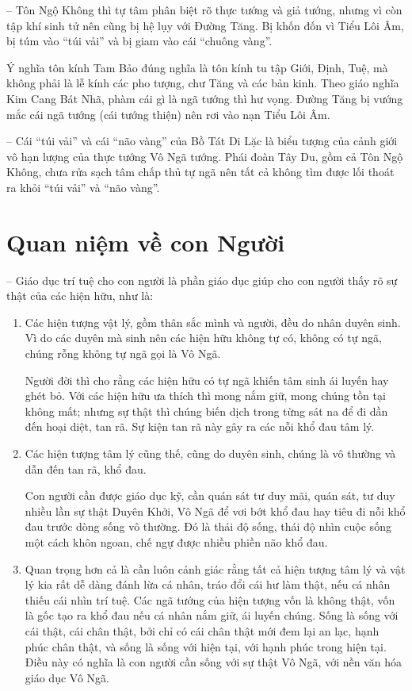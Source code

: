-- Tôn Ngộ Không thì tự tâm phân biệt rõ thực tướng và giả tướng, nhưng vì còn tập khí sinh tử nên cũng bị hệ lụy với Đường Tăng. Bị khốn đốn vì Tiểu Lôi Âm, bị túm vào ``túi vải'' và bị giam vào cái ``chuông vàng''.

Ý nghĩa tôn kính Tam Bảo đúng nghĩa là tôn kính tu tập Giới, Định, Tuệ, mà không phải là lễ kính các pho tượng, chư Tăng và các bản kinh. Theo giáo nghĩa Kim Cang Bát Nhã, phàm cái gì là ngã tướng thì hư vọng. Đường Tăng bị vướng mắc cái ngã tướng (cái tướng thiện) nên rơi vào nạn Tiểu Lôi Âm.

-- Cái ``túi vải'' và cái ``não vàng'' của Bồ Tát Di Lặc là biểu tượng của cảnh giới vô hạn lượng của thực tướng Vô Ngã tướng. Phái đoàn Tây Du, gồm cả Tôn Ngộ Không, chưa rửa sạch tâm chấp thủ tự ngã nên tất cả không tìm được lối thoát ra khỏi ``túi vải'' và ``não vàng''.

\section{Quan niệm về con Người} %
\label{sec:65_66_con_nguoi}

-- Giáo dục trí tuệ cho con người là phần giáo dục giúp cho con người thấy rõ sự thật của các hiện hữu, như là:

\begin{enumerate}[label=\itshape\alph*\upshape/]
    \item Các hiện tượng vật lý, gồm thân sắc mình và người, đều do nhân duyên sinh. Vì do các duyên mà sinh nên các hiện hữu không tự có, không có tự ngã, chúng rỗng không tự ngã gọi là Vô Ngã.

    Người đời thì cho rằng các hiện hữu có tự ngã khiến tâm sinh ái luyến hay ghét bỏ. Với các hiện hữu ưa thích thì mong nắm giữ, mong chúng tồn tại không mất; nhưng sự thật thì chúng biến dịch trong từng sát na để đi dần đến hoại diệt, tan rã. Sự kiện tan rã này gây ra các nỗi khổ đau tâm lý.

    \item Các hiện tượng tâm lý cũng thế, cũng do duyên sinh, chúng là vô thường và dẫn đến tan rã, khổ đau.

    Con người cần được giáo dục kỹ, cần quán sát tư duy mãi, quán sát, tư duy nhiều lần sự thật Duyên Khởi, Vô Ngã để vơi bớt khổ đau hay tiêu đi nỗi khổ đau trước dòng sống vô thường. Đó là thái độ sống, thái độ nhìn cuộc sống một cách khôn ngoan, chế ngự được nhiều phiền não khổ đau.

    \item Quan trọng hơn cả là cần luôn cảnh giác rằng tất cả hiện tượng tâm lý và vật lý kia rất dễ dàng đánh lừa cá nhân, tráo đổi cái hư làm thật, nếu cá nhân thiếu cái nhìn trí tuệ. Các ngã tướng của hiện tượng vốn là không thật, vốn là gốc tạo ra khổ đau nếu cá nhân nắm giữ, ái luyến chúng. Sống là sống với cái thật, cái chân thật, bởi chỉ có cái chân thật mới đem lại an lạc, hạnh phúc chân thật, và sống là sống với hiện tại, với hạnh phúc trong hiện tại. Điều này có nghĩa là con người cần sống với sự thật Vô Ngã, với nền văn hóa giáo dục Vô Ngã.
\end{enumerate}

